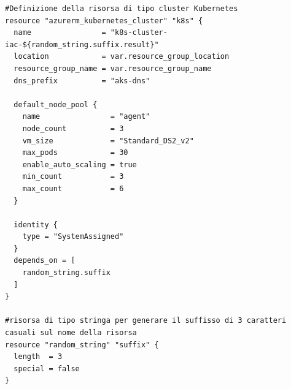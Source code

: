 \documentclass[a4paper,12pt]{report}
\begin{document}
\begin{lstlisting}[caption={\\\textit{Codice sorgente all'interno del file main.tf.\\ }}]
#Definizione della risorsa di tipo cluster Kubernetes
resource "azurerm_kubernetes_cluster" "k8s" {
  name                = "k8s-cluster-iac-${random_string.suffix.result}"
  location            = var.resource_group_location
  resource_group_name = var.resource_group_name
  dns_prefix          = "aks-dns"

  default_node_pool {
    name                = "agent"
    node_count          = 3
    vm_size             = "Standard_DS2_v2"
    max_pods            = 30
    enable_auto_scaling = true
    min_count           = 3
    max_count           = 6
  }

  identity {
    type = "SystemAssigned"
  }
  depends_on = [
    random_string.suffix
  ]
}

#risorsa di tipo stringa per generare il suffisso di 3 caratteri casuali sul nome della risorsa
resource "random_string" "suffix" {
  length  = 3
  special = false
} 
\end{lstlisting}
\end{document}
